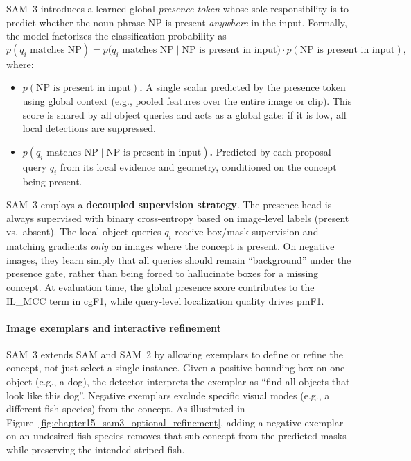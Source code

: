 \begin{enrichment}
\begin{enrichment}
		SAM~3 introduces a learned global \emph{presence token} whose sole responsibility is to predict whether the noun phrase NP is present \emph{anywhere} in the input. Formally, the model factorizes the classification probability as
		\begin{equation}
			p(q_i \text{ matches NP})
			= p\bigl(q_i \text{ matches NP} \mid \text{NP is present in input}\bigr)\cdot p(\text{NP is present in input}),
			\label{eq:chapter15_sam3_presence_factorization}
		\end{equation}
		where:
		\begin{itemize}
			\item \textbf{$p(\text{NP is present in input})$.} A single scalar predicted by the presence token using global context (e.g., pooled features over the entire image or clip). This score is shared by all object queries and acts as a global gate: if it is low, all local detections are suppressed.
			\item \textbf{$p(q_i \text{ matches NP} \mid \text{NP is present in input})$.} Predicted by each proposal query $q_i$ from its local evidence and geometry, conditioned on the concept being present.
		\end{itemize}
		
		SAM~3 employs a \textbf{decoupled supervision strategy}. The presence head is always supervised with binary cross-entropy based on image-level labels (present vs.\ absent). The local object queries $q_i$ receive box/mask supervision and matching gradients \emph{only} on images where the concept is present. On negative images, they learn simply that all queries should remain ``background'' under the presence gate, rather than being forced to hallucinate boxes for a missing concept. At evaluation time, the global presence score contributes to the IL\_MCC term in cgF1, while query-level localization quality drives pmF1.
		
		\newpage
		
		\paragraph{Image exemplars and interactive refinement}
		
		SAM~3 extends SAM and SAM~2 by allowing exemplars to define or refine the concept, not just select a single instance. Given a positive bounding box on one object (e.g., a dog), the detector interprets the exemplar as ``find all objects that look like this dog''. Negative exemplars exclude specific visual modes (e.g., a different fish species) from the concept. As illustrated in Figure~\ref{fig:chapter15_sam3_optional_refinement}, adding a negative exemplar on an undesired fish species removes that sub-concept from the predicted masks while preserving the intended striped fish.
		

\end{enrichment}
\end{enrichment}
